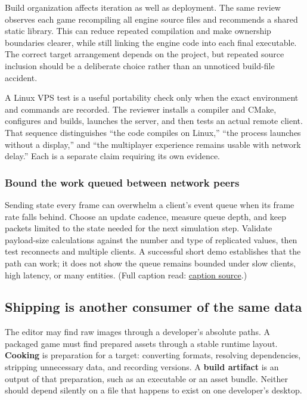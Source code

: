 Build organization affects iteration as well as deployment. The same review observes each game recompiling all engine source files and recommends a shared static library. This can reduce repeated compilation and make ownership boundaries clearer, while still linking the engine code into each final executable. The correct target arrangement depends on the project, but repeated source inclusion should be a deliberate choice rather than an unnoticed build-file accident.

A Linux VPS test is a useful portability check only when the exact environment and commands are recorded. The reviewer installs a compiler and CMake, configures and builds, launches the server, and then tests an actual remote client. That sequence distinguishes ``the code compiles on Linux,'' ``the process launches without a display,'' and ``the multiplayer experience remains usable with network delay.'' Each is a separate claim requiring its own evidence.

\subsubsection{Bound the work queued between network peers}\label{06-engine-ii-ch040-bound-the-work-queued-between-network-peers}

Sending state every frame can overwhelm a client's event queue when its frame rate falls behind. Choose an update cadence, measure queue depth, and keep packets limited to the state needed for the next simulation step. Validate payload-size calculations against the number and type of replicated values, then test reconnects and multiple clients. A successful short demo establishes that the path can work; it does not show the queue remains bounded under slow clients, high latency, or many entities. (Full caption read: \href{https://www.youtube.com/watch?v=hDCnTTyxLl8}{caption source}.)

\subsection{Shipping is another consumer of the same data}\label{06-engine-ii-ch040-shipping-is-another-consumer-of-the-same-data}

The editor may find raw images through a developer's absolute paths. A packaged game must find prepared assets through a stable runtime layout. \textbf{Cooking} is preparation for a target: converting formats, resolving dependencies, stripping unnecessary data, and recording versions. A \textbf{build artifact} is an output of that preparation, such as an executable or an asset bundle. Neither should depend silently on a file that happens to exist on one developer's desktop.


